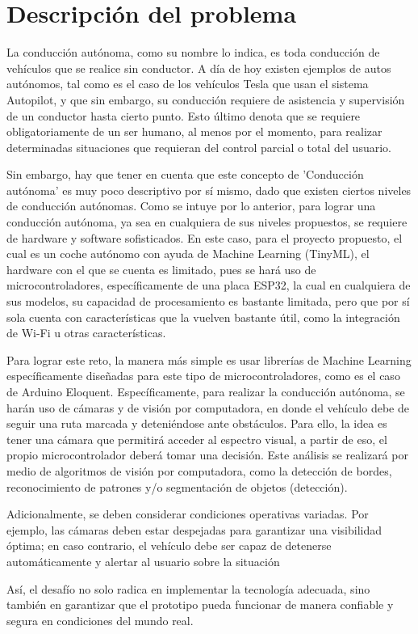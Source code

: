 \section{Descripción del problema}

La conducción autónoma, como su nombre lo indica, es toda conducción de vehículos que se realice sin conductor. A día de hoy existen ejemplos de autos autónomos, tal como es el caso de los vehículos Tesla que usan el sistema Autopilot, y que sin embargo, su conducción requiere de asistencia y supervisión de un conductor hasta cierto punto. Esto último denota que  se requiere obligatoriamente de un ser humano, al menos por el momento, para realizar determinadas situaciones que requieran del control parcial o total del usuario.

Sin embargo, hay que tener en cuenta que este concepto de 'Conducción autónoma' es muy poco descriptivo por sí mismo, dado que existen ciertos niveles de conducción autónomas.
Como se intuye por lo anterior, para lograr una conducción autónoma, ya sea en cualquiera de sus niveles propuestos, se requiere de hardware y software sofisticados. En este caso, para el proyecto propuesto, el cual es un coche autónomo con ayuda de Machine Learning (TinyML), el hardware con el que se cuenta es limitado, pues se hará uso de microcontroladores, específicamente de una placa ESP32, la cual en cualquiera de sus modelos, su capacidad de procesamiento es bastante limitada, pero que por sí sola cuenta con características que la vuelven bastante útil, como la integración de Wi-Fi u otras características.

Para lograr este reto, la manera más simple es usar librerías de Machine Learning específicamente diseñadas para este tipo de microcontroladores, como es el caso de Arduino Eloquent. Específicamente, para realizar la conducción autónoma, se harán uso de cámaras y de visión por computadora, en donde el vehículo debe de seguir una ruta marcada y deteniéndose ante obstáculos. Para ello, la idea es tener una cámara que permitirá acceder al espectro visual, a partir de eso, el propio microcontrolador deberá tomar una decisión. Este análisis se realizará por medio de algoritmos de visión por computadora, como la detección de bordes, reconocimiento de patrones y/o segmentación de objetos (detección).

Adicionalmente, se deben considerar condiciones operativas variadas. Por ejemplo, las cámaras deben estar despejadas para garantizar una visibilidad óptima; en caso contrario, el vehículo debe ser capaz de detenerse automáticamente y alertar al usuario sobre la situación

Así, el desafío no solo radica en implementar la tecnología adecuada, sino también en garantizar que el prototipo pueda funcionar de manera confiable y segura en condiciones del mundo real. 



